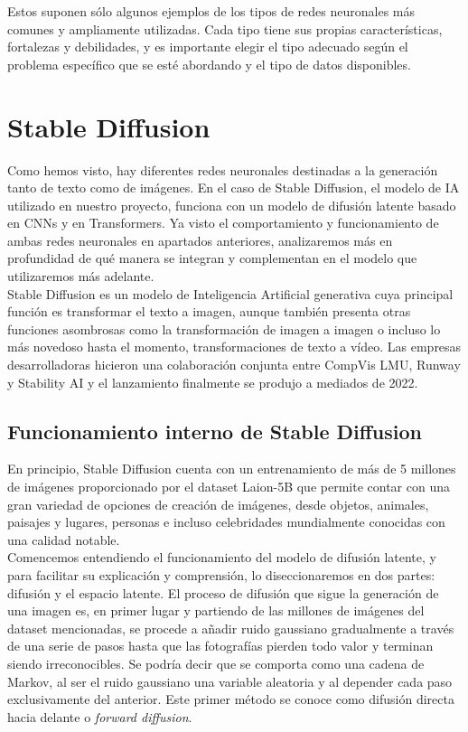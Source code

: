 Estos suponen sólo algunos ejemplos de los tipos de redes neuronales más comunes y ampliamente utilizadas. Cada tipo tiene sus propias características, fortalezas y debilidades, y es importante elegir el tipo adecuado según el problema específico que se esté abordando y el tipo de datos disponibles.\\

 \section{Stable Diffusion}

Como hemos visto, hay diferentes redes neuronales destinadas a la generación tanto de texto como de imágenes. En el caso de Stable Diffusion, el modelo de IA utilizado en nuestro proyecto, funciona con un modelo de difusión latente basado en CNNs y en Transformers. Ya visto el comportamiento y funcionamiento de ambas redes neuronales en apartados anteriores, analizaremos más en profundidad de qué manera se integran y complementan en el modelo que utilizaremos más adelante.\\


Stable Diffusion es un modelo de Inteligencia Artificial generativa cuya principal función es transformar el texto a imagen, aunque también presenta otras funciones asombrosas como la transformación de imagen a imagen o incluso lo más novedoso hasta el momento, transformaciones de texto a vídeo. Las empresas desarrolladoras hicieron una colaboración conjunta entre CompVis LMU, Runway y Stability AI y el lanzamiento finalmente se produjo a mediados de 2022. \\


\subsection{Funcionamiento interno de Stable Diffusion}

En principio, Stable Diffusion cuenta con un entrenamiento de más de 5 millones de imágenes proporcionado por el dataset Laion-5B que permite contar con una gran variedad de opciones de creación de imágenes, desde objetos, animales, paisajes y lugares, personas e incluso celebridades mundialmente conocidas con una calidad notable.\\ 

Comencemos entendiendo el funcionamiento del modelo de difusión latente, y para facilitar su explicación y comprensión,  lo diseccionaremos en dos partes: difusión y el espacio latente. El proceso de difusión que sigue la generación de una imagen es, en primer lugar y partiendo de las millones de imágenes del dataset mencionadas, se procede a añadir ruido gaussiano gradualmente a través de una serie de pasos hasta que las fotografías pierden todo valor y terminan siendo irreconocibles. Se podría decir que se comporta como una cadena de Markov, al ser el ruido gaussiano una variable aleatoria y al depender cada paso exclusivamente del anterior. Este primer método se conoce como difusión directa hacia delante o \textit{forward diffusion}.\\

